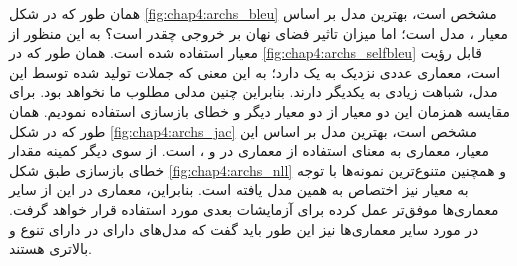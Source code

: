 همان طور که در شکل \ref{fig:chap4:archs_bleu} مشخص است، بهترین مدل بر اساس معیار \bleu[-2]{}، مدل  است؛ اما میزان تاثیر فضای نهان بر خروجی \decoder{} چقدر است؟ به این منظور از معیار \selfbleu[-2]{} استفاده شده است. همان طور که در \ref{fig:chap4:archs_selfbleu} قابل رؤیت است، \selfbleu[-2]{} معماری  عددی نزدیک به یک دارد؛ به این معنی که جملات تولید شده توسط این مدل، شباهت زیادی به یکدیگر دارند. بنابراین چنین مدلی مطلوب ما نخواهد بود. برای مقایسه همزمان این دو معیار از دو معیار دیگر \jaccard[-2]{} و خطای بازسازی استفاده نمودیم. همان طور که در شکل \ref{fig:chap4:archs_jac} مشخص است، بهترین مدل بر اساس این معیار، معماری  به معنای استفاده از معماری \transformer{} در \encoder{} و \decoder{}، است. از سوی دیگر کمینه مقدار خطای بازسازی طبق شکل \ref{fig:chap4:archs_nll} و همچنین متنوع‌ترین نمونه‌ها با توجه به معیار \selfbleu[-2]{} نیز اختصاص به همین مدل یافته است. بنابراین، معماری \transformer{} در این \task{} از سایر معماری‌ها موفق‌تر عمل کرده برای آزمایشات بعدی مورد استفاده قرار خواهد گرفت. در مورد سایر معماری‌ها نیز این طور باید گفت که مدل‌های دارای \transformer{} در \decoder{} دارای تنوع و \jaccard[-2]{} بالاتری هستند.
\iffalse
